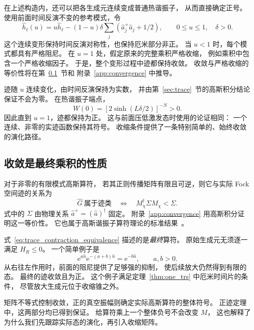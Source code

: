\documentclass[UTF8,11pt,a4paper,fontset=fandol]{ctexart}
\newcommand{\ee}{\mathrm e}
\numberwithin{equation}{section}
\begin{document}
在上述构造内，还可以把各生成元连续变成普通热谐振子，
从而直接确定正号。
使用前面时间反演不变的参考模式，令
\begin{equation}
 \hat h_\ell(u)=u\hat h_\ell-(1-u)\delta
 \sum_j(\hat a_j^+\hat a_j+1/2),
 \qquad 0\leq u\leq1,\quad\delta>0.
 \label{eq:thermal_deformation}
\end{equation}
这个连续变形保持时间反演对称性，也保持厄米部分非正。
当 $u<1$ 时，每个模式都具有严格阻尼。
在 $u=1$ 处，假定原来的完整乘积严格收缩，
例如乘积中包含一个严格收缩因子。
于是，整个变形过程中迹都保持收敛。
收敛与严格收缩的等价性将在第~\ref{sec:endpoint}~节和
附录~\ref{app:convergence} 中推导。

迹随 $u$ 连续变化，由时间反演保持为实数，
并由第~\ref{sec:trace}~节的高斯积分结论保证不会为零。
在热谐振子端点，
\begin{equation}
 W(0)=\left[2\sinh(L\delta/2)\right]^{-N}>0.
\end{equation}
因此直到 $u=1$，迹都保持为正。
这与前面压低激发态时使用的论证相同：
一个连续、非零的实迹函数保持其符号。
收缩条件提供了一条特别简单的、始终收敛的演化路径。

\subsection{收敛是最终乘积的性质}
\label{sec:endpoint}

对于非零的有限模式高斯算符，
若其正则传播矩阵有限且可逆，则它与实际 Fock 空间迹的关系为
\begin{equation}
 \boxed{\hat G\ \text{属于迹类}
 \quad\Longleftrightarrow\quad
 M_\chi^\dagger\Sigma M_\chi<\Sigma.}
 \label{eq:trace_contraction_equivalence}
\end{equation}
式中的 $\Sigma$ 由物理关系 $\hat a^+=(\hat a)^\dagger$ 固定。
附录~\ref{app:convergence} 用高斯积分证明这一等价性。
它也属于高斯谐振子算符理论的标准结果~\cite{hilgert1989,derezinski2017}。

式~\eqref{eq:trace_contraction_equivalence} 描述的是\emph{最终}算符。
原始生成元无须逐一满足 $H_R\leq0$。
一个简单例子是
\begin{equation}
 \ee^{a\hat n}\ee^{-(a+b)\hat n}=\ee^{-b\hat n},
 \qquad a,b>0.
 \label{eq:growth_cancellation}
\end{equation}
从右往左作用时，前面的阻尼提供了足够强的抑制，
使后续放大仍然得到有限的态。
最终的迹收敛且为正。
这个例子满足定理~\ref{thm:one_trs} 中厄米时间片的条件，
尽管放大生成元位于收缩锥之外。

矩阵不等式控制收敛，正的真空振幅则确定实际高斯算符的整体符号。
正迹定理中，这两部分均已得到保证。
给算符乘上一个整体负号不会改变 $M$，
这也解释了为什么我们先跟踪实际态的演化，再引入收缩矩阵。
\end{document}
